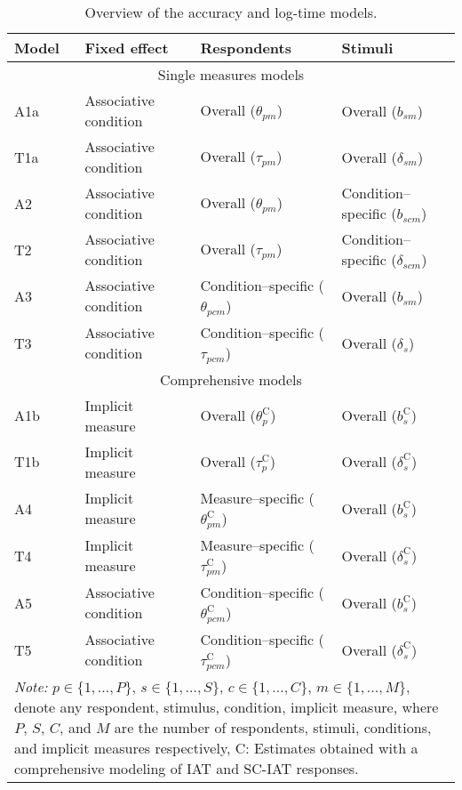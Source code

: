 \documentclass[12pt]{book}
\begin{document}
\begin{table}[h!]
	\centering\onehalfspacing
	\caption{Overview of the accuracy and log-time models.}
	\label{tab:overviewC} 
	\begin{tabularx}{\linewidth}{p{1.5cm} p{4cm} p{4.5cm} p{4.5cm} }
		\toprule
		Model & Fixed effect & Respondents & Stimuli\\
		\midrule
		\multicolumn{4}{c}{Single measures models}\\
		A1a  & Associative condition &  Overall  ($\theta_{pm}$)  &  Overall ($b_{sm}$)  \\
		T1a  & Associative condition &  Overall ($\tau_{pm}$)  &  Overall ($\delta_{sm}$)\\
		A2  & Associative condition &  Overall ($\theta_{pm}$)  &  Condition--specific ($b_{scm}$) \\
		T2  & Associative condition &  Overall ($\tau_{pm}$)  &  Condition--specific ($\delta_{scm}$)\\
		A3  & Associative condition &  Condition--specific ($\theta_{pcm}$)  &  Overall ($b_{sm}$) \\
		T3  & Associative condition &  Condition--specific ($\tau_{pcm}$)  &  Overall ($\delta_{s}$)\\
		\midrule
		\multicolumn{4}{c}{Comprehensive models}\\
		A1b  & Implicit measure &  Overall  ($\theta_p^\text{C}$)  &  Overall ($b_s^\text{C}$)  \\
		T1b  & Implicit measure &  Overall ($\tau_p^\text{C}$)  &  Overall ($\delta_s^\text{C}$)\\
		A4  & Implicit measure &  Measure--specific ($\theta_{pm}^\text{C}$) &   Overall ($b_s^\text{C}$)  \\
		T4   & Implicit measure &  Measure--specific ($\tau_{pm}^\text{C}$)  &  Overall ($\delta_{s}^\text{C}$)\\
		A5  & Associative condition &   Condition--specific ($\theta_{pcm}^\text{C}$)  &   Overall ($b_s^\text{C}$)  \\
		T5  & Associative condition &  Condition--specific ($\tau_{pcm}^\text{C}$)  &  Overall ($\delta_{s}^\text{C}$)\\
		
		\bottomrule
		\multicolumn{4}{p{15cm}}{\footnotesize{\emph{Note:} $p \in \{1, \ldots, P\}$, $s \in \{1,\ldots, S\}$, $c \in \{1,\ldots, C\}$, $m \in \{1, \ldots, M\}$, denote any respondent, stimulus, condition, implicit measure, where $P$, $S$, $C$, and $M$ are the number of respondents, stimuli, conditions, and implicit measures respectively, C: Estimates obtained with a comprehensive modeling of IAT and SC-IAT responses.}}
	\end{tabularx}
\end{table}
\end{document}
